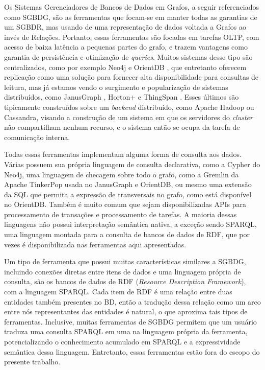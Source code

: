\documentclass[conference]{IEEEtran}
\begin{document}
Os Sistemas Gerenciadores de Bancos de Dados em Grafos, a seguir referenciados como SGBDG, são as ferramentas que focam-se em manter todas as garantias de um SGBDR, mas usando de uma representação de dados voltada a Grafos ao invés de Relações. Portanto, essas ferramentas são focadas em tarefas OLTP, com acesso de baixa latência a pequenas partes do grafo, e trazem vantagens como garantia de persistência e otimização de \emph{queries}. Muitos sistemas desse tipo são centralizados, como por exemplo Neo4j \cite{neo4j} e OrientDB \cite{orientdb}, que entretanto oferecem replicação como uma solução para fornecer alta disponibilidade para consultas de leitura, mas já estamos vendo o surgimento e popularização de sistemas distribuídos, como JanusGraph \cite{janusgraph}, Horton+ \cite{horton} e ThingSpan \cite{thingspan}. Esses últimos são tipicamente construídos sobre um \emph{backend} distribuído, como Apache Hadoop ou Cassandra, visando a construção de um sistema em que os servidores do \emph{cluster} não compartilham nenhum recurso, e o sistema então se ocupa da tarefa de comunicação interna.

Todas essas ferramentas implementam alguma forma de consulta aos dados. Várias possuem sua própria linguagem de consulta declarativa, como a Cypher do Neo4j, uma linguagem de checagem sobre todo o grafo, como a Gremlin da Apache TinkerPop usada no JanusGraph e OrientDB, ou mesmo uma extensão da SQL que permita a expressão de transversais no grafo, como está disponível no OrientDB. Também é muito comum que sejam disponibilizadas APIs para processamento de transações e processamento de tarefas. A maioria dessas linguagens não possui interpretação semântica nativa, a exceção sendo SPARQL, uma linguagem montada para a consulta de bancos de dados de RDF, que por vezes é disponibilizada nas ferramentas aqui apresentadas.

Um tipo de ferramenta que possui muitas características similares a SGBDG, incluindo conexões diretas entre itens de dados e uma linguagem própria de consulta, são os bancos de dados de RDF (\emph{Resource Description Framework}), com a linguagem SPARQL. Cada item de RDF é uma relação entre duas entidades também presentes no BD, então a tradução dessa relação como um arco entre nós representantes das entidades é natural, o que aproxima tais tipos de ferramentas. Inclusive, muitas ferramentas de SGBDG permitem que um usuário traduza uma consulta SPARQL em uma na linguagem própria da ferramenta, potencializando o conhecimento acumulado em SPARQL e a expressividade semântica dessa linguagem. Entretanto, essas ferramentas estão fora do escopo do presente trabalho.
\end{document}
